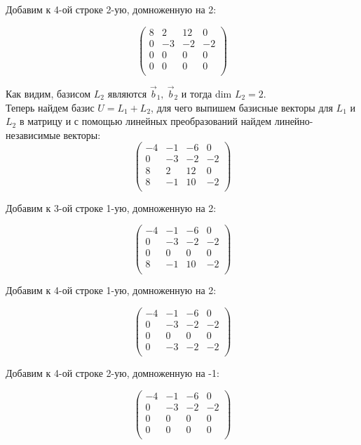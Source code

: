 	Добавим к 4-ой строке 2-ую, домноженную на 2:
	
	\[
	\begin{pmatrix}
	8 & 2 & 12 & 0 \\
	0 & -3 & -2 & -2 \\
	0 & 0 & 0 & 0 \\
	0 & 0 & 0 & 0 \\
	\end{pmatrix}
	\]
	
	Как видим, базисом $L_2$ являются $\vec b_1,\ \vec b_2$ и тогда dim $L_2 = 2$. \\
	
	Теперь найдем базис $U = L_1 + L_2$, для чего выпишем базисные векторы для $L_1$ и $L_2$ в матрицу и с помощью линейных преобразований найдем линейно-независимые векторы: \\
	
	\[
	\begin{pmatrix}
	-4 & -1 & -6 & 0 \\
	0 & -3 & -2 & -2 \\
	8 & 2 & 12 & 0 \\
	8 & -1 & 10 & -2 \\
	\end{pmatrix}
	\]
	
	Добавим к 3-ой строке 1-ую, домноженную на 2:
	
	\[
	\begin{pmatrix}
	-4 & -1 & -6 & 0 \\
	0 & -3 & -2 & -2 \\
	0 & 0 & 0 & 0 \\
	8 & -1 & 10 & -2 \\
	\end{pmatrix}
	\]
	
	Добавим к 4-ой строке 1-ую, домноженную на 2:
	
	\[
	\begin{pmatrix}
	-4 & -1 & -6 & 0 \\
	0 & -3 & -2 & -2 \\
	0 & 0 & 0 & 0 \\
	0 & -3 & -2 & -2 \\
	\end{pmatrix}
	\]
	
	Добавим к 4-ой строке 2-ую, домноженную на -1:
	
	\[
	\begin{pmatrix}
	-4 & -1 & -6 & 0 \\
	0 & -3 & -2 & -2 \\
	0 & 0 & 0 & 0 \\
	0 & 0 & 0 & 0 \\
	\end{pmatrix}
	\]
	
